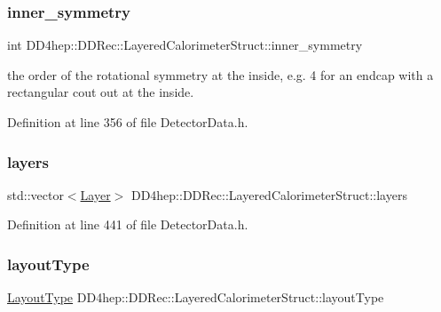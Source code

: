 \subsubsection{\texorpdfstring{inner\+\_\+symmetry}{inner\_symmetry}}
{\footnotesize\ttfamily int D\+D4hep\+::\+D\+D\+Rec\+::\+Layered\+Calorimeter\+Struct\+::inner\+\_\+symmetry}

the order of the rotational symmetry at the inside, e.\+g. 4 for an endcap with a rectangular cout out at the inside. 

Definition at line 356 of file Detector\+Data.\+h.

\hypertarget{struct_d_d4hep_1_1_d_d_rec_1_1_layered_calorimeter_struct_afe938fc0d544b503acde8269461df211}{}\label{struct_d_d4hep_1_1_d_d_rec_1_1_layered_calorimeter_struct_afe938fc0d544b503acde8269461df211} 
\subsubsection{\texorpdfstring{layers}{layers}}
{\footnotesize\ttfamily std\+::vector$<$\hyperlink{struct_d_d4hep_1_1_d_d_rec_1_1_layered_calorimeter_struct_1_1_layer}{Layer}$>$ D\+D4hep\+::\+D\+D\+Rec\+::\+Layered\+Calorimeter\+Struct\+::layers}



Definition at line 441 of file Detector\+Data.\+h.

\hypertarget{struct_d_d4hep_1_1_d_d_rec_1_1_layered_calorimeter_struct_a141e4dca7fb6f24249a79912e18e964d}{}\label{struct_d_d4hep_1_1_d_d_rec_1_1_layered_calorimeter_struct_a141e4dca7fb6f24249a79912e18e964d} 
\subsubsection{\texorpdfstring{layout\+Type}{layoutType}}
{\footnotesize\ttfamily \hyperlink{struct_d_d4hep_1_1_d_d_rec_1_1_layered_calorimeter_struct_a560e60d5a6a1671ab8b21629714b4d36}{Layout\+Type} D\+D4hep\+::\+D\+D\+Rec\+::\+Layered\+Calorimeter\+Struct\+::layout\+Type}



